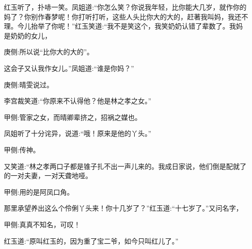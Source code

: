 \begin{parag}
    红玉听了，扑哧一笑。凤姐道:“你怎么笑？你说我年轻，比你能大几岁，就作你的妈了？你别作春梦呢！你打听打听，这些人头比你大的大的，赶著我叫妈，我还不理。今儿抬举了你呢！”红玉笑道:“我不是笑这个，我笑奶奶认错了辈数了。我妈是奶奶的女儿，\begin{note}庚侧:所以说“比你大的大的”。\end{note}这会子又认我作女儿。”凤姐道:“谁是你妈？”\begin{note}庚侧:晴雯说过。\end{note}李宫裁笑道:“你原来不认得他？他是林之孝之女。”\begin{note}甲侧:管家之女，而晴卿辈挤之，招祸之媒也。\end{note}凤姐听了十分诧异，说道:“哦！原来是他的丫头。”\begin{note}甲侧:传神。\end{note}又笑道:“林之孝两口子都是锥子扎不出一声儿来的。我成日家说，他们倒是配就了的一对夫妻，一对天聋地哑。\begin{note}甲侧:用的是阿凤口角。\end{note}那里承望养出这么个伶俐丫头来！你十几岁了？”红玉道:“十七岁了。”又问名字，\begin{note}甲侧:真真不知名，可叹！\end{note}红玉道:“原叫红玉的，因为重了宝二爷，如今只叫红儿了。”
\end{parag}


